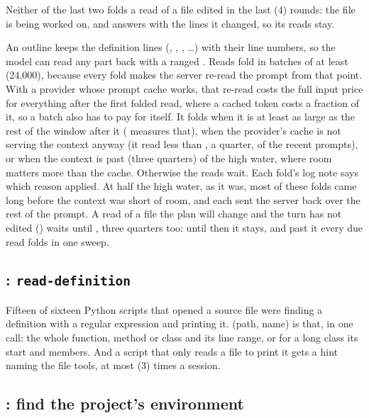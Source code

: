 Neither of the last two folds a read of a file edited in the last
 (4) rounds: the file is being worked on, and
 answers with the lines it changed, so its reads stay.

An outline keeps the definition lines (, ,
, \ldots) with their line numbers, so the model can
read any part back with a ranged . Reads fold in batches of
at least  (24,000), because every fold makes the
server re-read the prompt from that point. With a provider whose prompt
cache works, that re-read costs the full input price for everything after
the first folded read, where a cached token costs a fraction of it, so a
batch also has to pay for itself. It folds when it is at least as large as
the rest of the window after it ( measures
that), when the provider's cache is not serving the context anyway (it read
less than , a quarter, of the recent prompts), or
when the context is past  (three quarters) of the
high water, where room matters more than the cache. Otherwise the reads
wait. Each fold's log note says which reason applied. At half the high
water, as it was, most of these folds came long before the context was
short of room, and each sent the server back over the rest of the prompt.
A read of a file the plan will change and the turn has not edited
() waits until , three
quarters too: until then it stays, and past it every due read folds in one
sweep.

\subsection{: \texttt{read-definition}}

Fifteen of sixteen Python scripts that opened a source file were finding a
definition with a regular expression and printing it. 
(path, name) is that, in one call: the whole function, method or class and
its line range, or for a long class its start and members. And a script
that only reads a file to print it gets a hint naming the file tools, at
most  (3) times a session.

\subsection{: find the project's environment}


